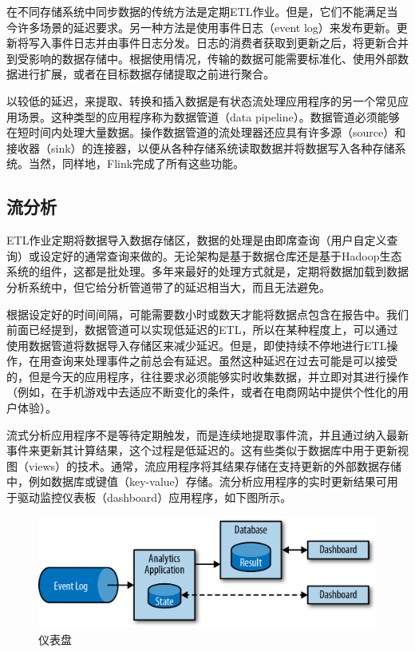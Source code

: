 \documentclass[cn,11pt,chinese]{elegantbook}
\begin{document}
在不同存储系统中同步数据的传统方法是定期ETL作业。但是，它们不能满足当今许多场景的延迟要求。另一种方法是使用事件日志（event
log）来发布更新。更新将写入事件日志并由事件日志分发。日志的消费者获取到更新之后，将更新合并到受影响的数据存储中。根据使用情况，传输的数据可能需要标准化、使用外部数据进行扩展，或者在目标数据存储提取之前进行聚合。

以较低的延迟，来提取、转换和插入数据是有状态流处理应用程序的另一个常见应用场景。这种类型的应用程序称为数据管道（data
pipeline）。数据管道必须能够在短时间内处理大量数据。操作数据管道的流处理器还应具有许多源（source）和接收器（sink）的连接器，以便从各种存储系统读取数据并将数据写入各种存储系统。当然，同样地，Flink完成了所有这些功能。

\hypertarget{ux6d41ux5206ux6790}{%
\subsection{流分析}\label{ux6d41ux5206ux6790}}

ETL作业定期将数据导入数据存储区，数据的处理是由即席查询（用户自定义查询）或设定好的通常查询来做的。无论架构是基于数据仓库还是基于Hadoop生态系统的组件，这都是批处理。多年来最好的处理方式就是，定期将数据加载到数据分析系统中，但它给分析管道带了的延迟相当大，而且无法避免。

根据设定好的时间间隔，可能需要数小时或数天才能将数据点包含在报告中。我们前面已经提到，数据管道可以实现低延迟的ETL，所以在某种程度上，可以通过使用数据管道将数据导入存储区来减少延迟。但是，即使持续不停地进行ETL操作，在用查询来处理事件之前总会有延迟。虽然这种延迟在过去可能是可以接受的，但是今天的应用程序，往往要求必须能够实时收集数据，并立即对其进行操作（例如，在手机游戏中去适应不断变化的条件，或者在电商网站中提供个性化的用户体验）。

流式分析应用程序不是等待定期触发，而是连续地提取事件流，并且通过纳入最新事件来更新其计算结果，这个过程是低延迟的。这有些类似于数据库中用于更新视图（views）的技术。通常，流应用程序将其结果存储在支持更新的外部数据存储中，例如数据库或键值（key-value）存储。流分析应用程序的实时更新结果可用于驱动监控仪表板（dashboard）应用程序，如下图所示。

\begin{figure}
\centering
\includegraphics{images/spaf_0106.png}
\caption{仪表盘}
\end{figure}
\end{document}
